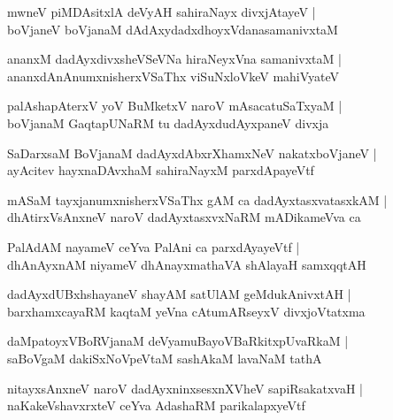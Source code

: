 \documentclass[twoside,12pt,openright]{book}
\newcounter{shloka}[chapter]
\begin{document}
\begin{shloka}%
mwneV piMDAsitxlA deVyAH sahiraNayx divxjAtayeV |\\
boVjaneV boVjanaM dAdAxydadxdhoyxVdanasamanivxtaM 
\end{shloka}

\begin{shloka}%
ananxM dadAyxdivxsheVSeVNa hiraNeyxVna samanivxtaM |\\
ananxdAnAnumxnisherxVSaThx viSuNxloVkeV mahiVyateV 
\end{shloka}

\begin{shloka}%
palAshapAterxV yoV BuMketxV naroV mAsacatuSaTxyaM |\\
boVjanaM GaqtapUNaRM tu dadAyxdudAyxpaneV divxja
\end{shloka}

\begin{shloka}%
SaDarxsaM BoVjanaM dadAyxdAbxrXhamxNeV nakatxboVjaneV |\\
ayAcitev hayxnaDAvxhaM sahiraNayxM parxdApayeVtf
\end{shloka}

\begin{shloka}%
mASaM tayxjanumxnisherxVSaThx gAM ca dadAyxtasxvatasxkAM |\\
dhAtirxVsAnxneV naroV dadAyxtasxvxNaRM mADikameVva ca
\end{shloka}

\begin{shloka}%
PalAdAM nayameV ceYva PalAni ca parxdAyayeVtf |\\
dhAnAyxnAM niyameV dhAnayxmathaVA shAlayaH samxqqtAH
\end{shloka}

\begin{shloka}%
dadAyxdUBxhshayaneV shayAM satUlAM geMdukAnivxtAH |\\
barxhamxcayaRM kaqtaM yeVna cAtumARseyxV divxjoVtatxma
\end{shloka}

\begin{shloka}%
daMpatoyxVBoRVjanaM deVyamuBayoVBaRkitxpUvaRkaM |\\
saBoVgaM dakiSxNoVpeVtaM sashAkaM lavaNaM tathA 
\end{shloka}

\begin{shloka}%
nitayxsAnxneV naroV dadAyxninxsesxnXVheV sapiRsakatxvaH |\\
naKakeVshavxrxteV ceYva AdashaRM parikalapxyeVtf 
\end{shloka}
\end{document}
